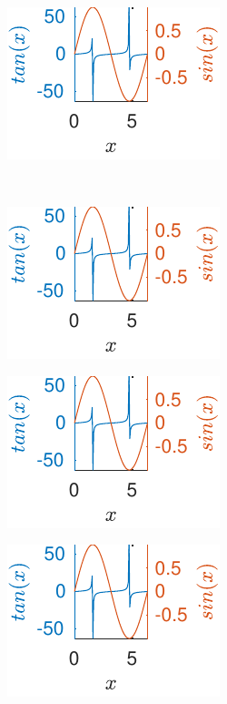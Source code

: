\begin{figure}[H]
\begin{subfigure}[b]{\fourfig\textwidth}
			\centering
			\includegraphics{../matlab/fig/examples/tansin-with-ffsp.pdf}
		\end{subfigure}
		\\
		\begin{subfigure}[b]{\fourfig\textwidth} 
			\includegraphics{../matlab/fig/examples/tansin-with-ffsp.pdf}
		\end{subfigure}
		\hfil
		\begin{subfigure}[b]{\fourfig\textwidth} 
			\includegraphics{../matlab/fig/examples/tansin-with-ffsp.pdf}
		\end{subfigure}
		\hfil
		\begin{subfigure}[b]{\fourfig\textwidth} 
			\includegraphics{../matlab/fig/examples/tansin-with-ffsp.pdf}

\end{subfigure}
\end{figure}
